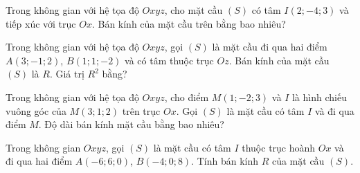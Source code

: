 \begin{bt}%
	Trong không gian với  hệ tọa độ $Oxyz$, cho mặt cầu $(S)$ có tâm $I\left(2;-4;3\right)$ và tiếp xúc với trục $Ox$. Bán kính của mặt cầu trên bằng bao nhiêu?
\end{bt}

\begin{bt}%
	Trong không gian với hệ tọa độ $Oxyz$, gọi $(S)$ là mặt cầu đi qua hai điểm $A(3;-1;2)$, $B(1;1;-2)$ và có tâm thuộc trục $Oz$. Bán kính của mặt  cầu $(S)$ là $R$. Giá trị $R^2$ bằng?
\end{bt}

\begin{bt}%
	Trong không gian với hệ tọa độ $Oxyz$, cho điểm $M\left(1;-2;3\right)$ và $I$ là hình chiếu vuông góc của $M\left(3;1;2\right)$ trên trục $Ox$. Gọi $(S)$ là mặt cầu có tâm $I$ và đi qua điểm $M$. Độ dài bán kính  mặt cầu bằng bao nhiêu?
\end{bt}

\begin{bt}%
	Trong không gian $Oxyz$, gọi $(S)$ là mặt cầu có tâm $I$ thuộc trục hoành $Ox$ và đi qua hai điểm $A(-6;6;0)$, $B(-4;0;8)$. Tính bán  kính $R$ của mặt cầu $(S)$.
\end{bt}

